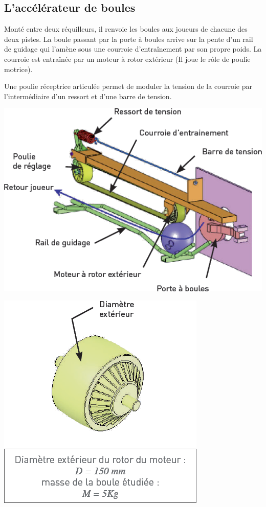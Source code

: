 \documentclass[10pt,fleqn]{article} %
\begin{document}
\begin{multicols}{2}
\subsection*{L'accélérateur de boules}

Monté entre deux réquilleurs, il renvoie les boules aux joueurs de chacune des deux pistes. La boule passant par la porte à boules arrive sur la pente d'un rail de guidage qui l'amène sous une courroie d'entraînement par son propre poids. La courroie est entraînée par un moteur à rotor extérieur (Il joue le rôle de poulie motrice).

Une poulie réceptrice articulée permet de moduler la tension de la courroie par l'intermédiaire d'un ressort et d'une barre de tension.


\begin{center}
\includegraphics[width=\linewidth]{images/fig_02}
\end{center}


\begin{center}
\includegraphics[width=\linewidth]{images/fig_03}
\end{center}


\end{multicols}
\end{document}

